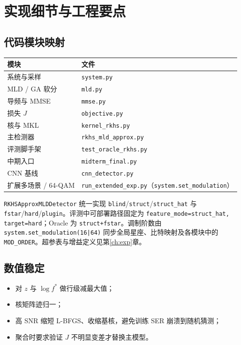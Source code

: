 \chapter{实现细节与工程要点}
\label{ch:impl}

\section{代码模块映射}

\begin{center}
\begin{tabular}{ll}
\toprule
模块 & 文件 \\
\midrule
系统与采样 & \texttt{system.py} \\
MLD / GA 软分 & \texttt{mld.py} \\
导频与 MMSE & \texttt{mmse.py} \\
损失 $J$ & \texttt{objective.py} \\
核与 MKL & \texttt{kernel\_rkhs.py} \\
主检测器 & \texttt{rkhs\_mld\_approx.py} \\
评测脚手架 & \texttt{test\_oracle\_rkhs.py} \\
中期入口 & \texttt{midterm\_final.py} \\
CNN 基线 & \texttt{cnn\_detector.py} \\
扩展多场景 / 64-QAM & \texttt{run\_extended\_exp.py}（\texttt{system.set\_modulation}） \\
\bottomrule
\end{tabular}
\end{center}

\texttt{RKHSApproxMLDDetector} 统一实现 \texttt{blind}/\texttt{struct}/\texttt{struct\_hat} 与 \texttt{fstar}/\texttt{hard}/\texttt{plugin}。评测中可部署路径固定为 \texttt{feature\_mode=struct\_hat, target=hard}；Oracle 为 \texttt{struct+fstar}。调制阶数由 \texttt{system.set\_modulation(16|64)} 同步全局星座、比特映射及各模块中的 \texttt{MOD\_ORDER}。超参表与增益定义见第\ref{ch:exp}章。

\section{数值稳定}

\begin{itemize}
  \item 对 $z$ 与 $\log f^*$ 做行级减最大值；
  \item 核矩阵迹归一；
  \item 高 SNR 缩短 L-BFGS、收缩基核，避免训练 SER 崩溃到随机猜测；
  \item 聚合时要求验证 $J$ 不明显变差才替换主模型。
\end{itemize}


